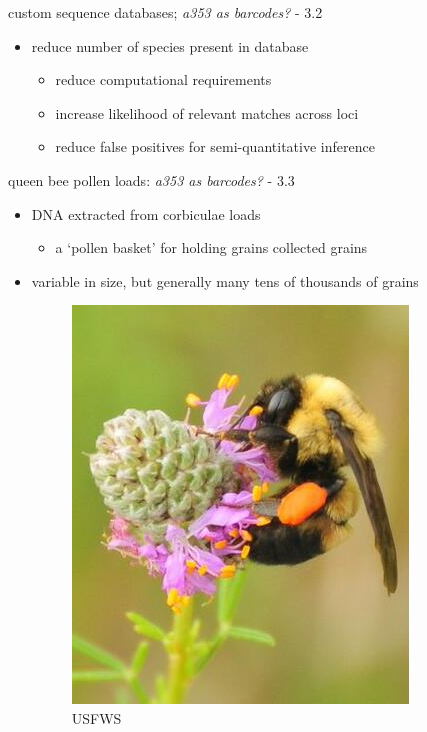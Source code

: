 \documentclass[
  ignorenonframetext,
]{beamer}
\providecommand{\tightlist}{%
  \setlength{\itemsep}{0pt}\setlength{\parskip}{0pt}}
\begin{document}
\begin{frame}{custom sequence databases; \emph{a353 as barcodes?} - 3.2}
\protect\hypertarget{custom-sequence-databases-a353-as-barcodes---3.2}{}
\begin{itemize}
\tightlist
\item
  reduce number of species present in database

  \begin{itemize}
  \tightlist
  \item
    reduce computational requirements
  \item
    increase likelihood of relevant matches across loci
  \item
    reduce false positives for semi-quantitative inference
  \end{itemize}
\end{itemize}
\end{frame}

\begin{frame}{queen bee pollen loads: \emph{a353 as barcodes?} - 3.3}
\protect\hypertarget{queen-bee-pollen-loads-a353-as-barcodes---3.3}{}
\begin{itemize}
\item
  DNA extracted from corbiculae loads

  \begin{itemize}
  \tightlist
  \item
    a `pollen basket' for holding grains collected grains
  \end{itemize}
\item
  variable in size, but generally many tens of thousands of grains

  \begin{figure}
  \centering
  \includegraphics{../graphics/pictures/Corbiculae-FWS.jpeg}
  \caption{USFWS}
  \end{figure}
\end{itemize}
\end{frame}
\end{document}
